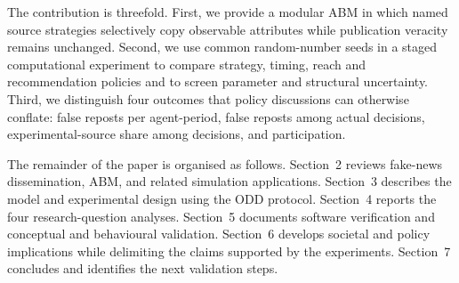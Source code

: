 The contribution is threefold. First, we provide a modular ABM in which named source strategies selectively copy observable attributes while publication veracity remains unchanged. Second, we use common random-number seeds in a staged computational experiment to compare strategy, timing, reach and recommendation policies and to screen parameter and structural uncertainty. Third, we distinguish four outcomes that policy discussions can otherwise conflate: false reposts per agent-period, false reposts among actual decisions, experimental-source share among decisions, and participation.

The remainder of the paper is organised as follows. Section~2 reviews fake-news dissemination, ABM, and related simulation applications. Section~3 describes the model and experimental design using the ODD protocol. Section~4 reports the four research-question analyses. Section~5 documents software verification and conceptual and behavioural validation. Section~6 develops societal and policy implications while delimiting the claims supported by the experiments. Section~7 concludes and identifies the next validation steps.
